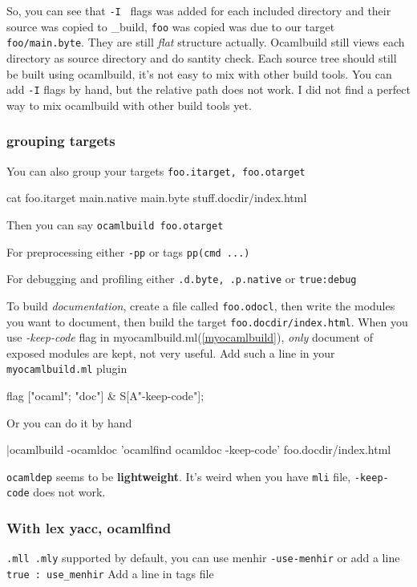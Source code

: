 
So, you can see that \verb|-I | flags was added for each included
directory and their source was copied to \_build, \verb|foo| was
copied was due to our target \verb|foo/main.byte|. They are still
\textit{flat} structure actually. Ocamlbuild still views each
directory as source directory and do santity check. Each source tree
should still be built using ocamlbuild, it's not easy to mix with
other build tools. You can add \verb|-I| flags by hand, but the
relative path does not work. I did not find a perfect way to mix
ocamlbuild with other build tools yet.


\subsubsection{grouping targets}
You can also  group your targets \verb|foo.itarget, foo.otarget|

\begin{bashcode}
cat foo.itarget
main.native
main.byte 
stuff.docdir/index.html    
\end{bashcode}
Then you can say \verb|ocamlbuild foo.otarget|

For preprocessing either \verb|-pp| or tags \verb|pp(cmd ...)| 

For debugging and profiling either \verb|.d.byte, .p.native| or
\verb|true:debug|

To build \textit{documentation}, create a file called \verb|foo.odocl|, then
write the modules you want to document, then build the target
\verb|foo.docdir/index.html|. When you use \textit{-keep-code} flag in
myocamlbuild.ml(\ref{myocamlbuild}), \textit{only} document of exposed
modules are kept, not very useful.  Add such a line in your
\verb|myocamlbuild.ml| plugin

\begin{ocamlcode}
flag ["ocaml"; "doc"] & S[A"-keep-code"];
\end{ocamlcode}
Or you can do it by hand

\begin{bashcode}
|ocamlbuild -ocamldoc 'ocamlfind ocamldoc -keep-code' foo.docdir/index.html
\end{bashcode}
\verb|ocamldep| seems to be \textbf{ lightweight}.  It's weird when
you have \verb|mli| file, \verb|-keep-code| does not work.





\subsubsection{With lex yacc, ocamlfind }
\verb|.mll .mly| supported by default, you can use menhir
\verb|-use-menhir| or add a line \verb|true : use_menhir|
Add a line in tags file

